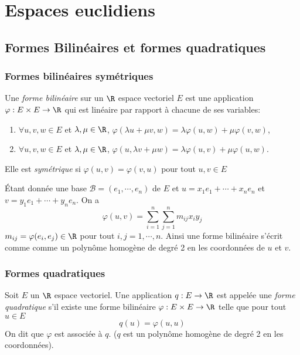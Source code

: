 \chapter{Espaces euclidiens}

\sld{\vfill\pagebreak[5]}%
\section{Formes Bilinéaires et formes quadratiques}

\subsection{Formes bilinéaires symétriques}

\begin{definition}
	Une \emph{forme bilinéaire} sur un $\R$ espace vectoriel $E$ est une application $\varphi: E\times E \to \R$ qui est linéaire par rapport à chacune de ses variables: 
	\begin{enumerate}
		\item  $\forall u,v,w\in E$ et $\lambda,\mu\in\R$, $\varphi(\lambda u + \mu v,w) = \lambda \varphi(u,w) + \mu \varphi(v,w)$,
		\item  $\forall u,v,w\in E$ et $\lambda,\mu\in\R$, $\varphi(u,\lambda v + \mu w) = \lambda \varphi(u,v) + \mu \varphi(u,w)$.
	\end{enumerate}
	Elle est \emph{symétrique} si $\varphi(u,v) = \varphi(v,u)$ pour tout $u,v\in E$
\end{definition}

\noindent \'Etant donnée une base $\mathcal B = \left( e_1,\cdots,e_n \right)$ de $E$ et $u=x_1 e_1 + \cdots+ x_n e_n$ et $v=y_1e_1+\cdots+y_n e_n$. On a 
\[
	\varphi (u,v) = \sum_{i=1}^n \sum_{j=1}^n m_{ij} x_iy_j
\]
$m_{ij} = \varphi(e_i,e_j) \in \R$ pour tout $i,j = 1,\cdots,n$. Ainsi une forme bilinéaire s'écrit comme comme un polynôme homogène de degré 2 en les coordonnées de $u$ et $v$.


\begin{exemple}
	\pl{\rep{7cm}}
\end{exemple}

\subsection{Formes quadratiques}

\begin{definition}
	Soit $E$ un $\R$ espace vectoriel. Une application $q:E \to \R$ est appelée une \emph{forme quadratique} s'il existe une forme bilinéaire $\varphi:E\times E \to \R$ telle que pour tout $u\in E$
	\[
q(u) = \varphi(u,u)
	\]
On dit que $\varphi$ est associée à $q$. ($q$ est un polynôme homogène de degré 2 en les coordonnées).
\end{definition}

